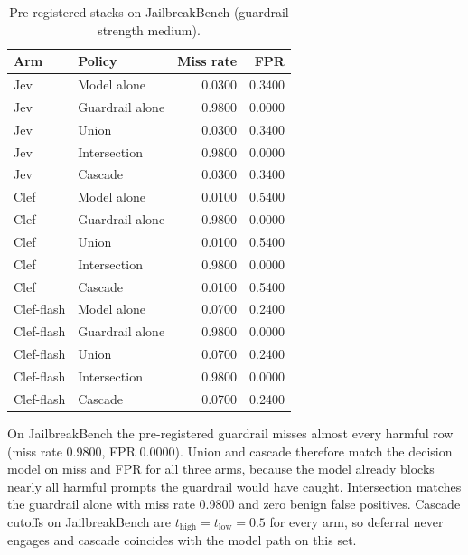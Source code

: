 \begin{table}[t]
  \centering
  \caption{Pre-registered stacks on JailbreakBench (guardrail strength medium).}
  \label{tab:stack-jbb}
  \begin{tabular}{llrr}
    \toprule
    Arm & Policy & Miss rate & FPR \\
    \midrule
    Jev & Model alone & 0.0300 & 0.3400 \\
    Jev & Guardrail alone & 0.9800 & 0.0000 \\
    Jev & Union & 0.0300 & 0.3400 \\
    Jev & Intersection & 0.9800 & 0.0000 \\
    Jev & Cascade & 0.0300 & 0.3400 \\
    \midrule
    Clef & Model alone & 0.0100 & 0.5400 \\
    Clef & Guardrail alone & 0.9800 & 0.0000 \\
    Clef & Union & 0.0100 & 0.5400 \\
    Clef & Intersection & 0.9800 & 0.0000 \\
    Clef & Cascade & 0.0100 & 0.5400 \\
    \midrule
    Clef-flash & Model alone & 0.0700 & 0.2400 \\
    Clef-flash & Guardrail alone & 0.9800 & 0.0000 \\
    Clef-flash & Union & 0.0700 & 0.2400 \\
    Clef-flash & Intersection & 0.9800 & 0.0000 \\
    Clef-flash & Cascade & 0.0700 & 0.2400 \\
    \bottomrule
  \end{tabular}
\end{table}

On JailbreakBench the pre-registered guardrail misses almost every harmful row (miss rate 0.9800, FPR 0.0000).
Union and cascade therefore match the decision model on miss and FPR for all three arms, because the model already blocks nearly all harmful prompts the guardrail would have caught.
Intersection matches the guardrail alone with miss rate 0.9800 and zero benign false positives.
Cascade cutoffs on JailbreakBench are $t_{\mathrm{high}}=t_{\mathrm{low}}=0.5$ for every arm, so deferral never engages and cascade coincides with the model path on this set.

